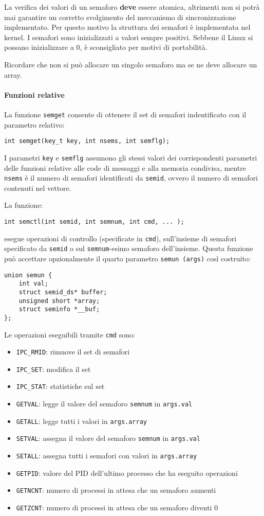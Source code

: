 \documentclass[a4paper]{article}
\begin{document}
La verifica dei valori di un semaforo \textbf{deve} essere atomica, altrimenti non si potrà mai garantire un corretto svolgimento del meccanismo di sincronizzazione implementato. Per questo motivo la struttura dei semafori è implementata nel kernel. I semafori sono inizializzati a valori sempre positivi. Sebbene il Linux si possano inizializzare a 0, è sconsigliato per motivi di portabilità.

Ricordare che non si può allocare un singolo semaforo ma se ne deve allocare un array. 

\paragraph{Funzioni relative}
La funzione \verb|semget| consente di ottenere il set di semafori indentificato con il parametro relativo:
\begin{verbatim}
int semget(key_t key, int nsems, int semflg);
\end{verbatim}

I parametri \verb|key| e \verb|semflg| assumono gli stessi valori dei corrispondenti parametri delle funzioni relative alle code di messaggi e alla memoria condivisa, mentre \verb|nsems| è il numero di semafori identificati da \verb|semid|, ovvero il numero di semafori contenuti nel vettore.

La funzione:
\begin{verbatim}
int semctl(int semid, int semnum, int cmd, ... );
\end{verbatim}
esegue operazioni di controllo (specificate in \verb|cmd|), sull'insieme di semafori specificato da \verb|semid| o sul \verb|semnum|-esimo semaforo dell'insieme.
Questa funzione può accettare opzionalmente il quarto parametro \verb|semun (args)| così costruito:
\begin{verbatim}
union semun {
    int val;
    struct semid_ds* buffer;
    unsigned short *array;
    struct seminfo *__buf;
};
\end{verbatim}

Le operazioni eseguibili tramite \verb|cmd| sono:
\begin{itemize}
\item \verb|IPC_RMID|: rimuove il set di semafori
\item \verb|IPC_SET|: modifica il set
\item \verb|IPC_STAT|: statistiche sul set
\item \verb|GETVAL|: legge il valore del semaforo \verb|semnum| in \verb|args.val|
\item \verb|GETALL|: legge tutti i valori in \verb|args.array|
\item \verb|SETVAL|: assegna il valore del semaforo \verb|semnum| in \verb|args.val|
\item \verb|SETALL|: assegna tutti i semafori con valori in \verb|args.array|
\item \verb|GETPID|: valore del PID dell'ultimo processo che ha eseguito operazioni
\item \verb|GETNCNT|: numero di processi in attesa che un semaforo aumenti
\item \verb|GETZCNT|: numero di processi in attesa che un semaforo diventi 0
\end{itemize}
\end{document}
